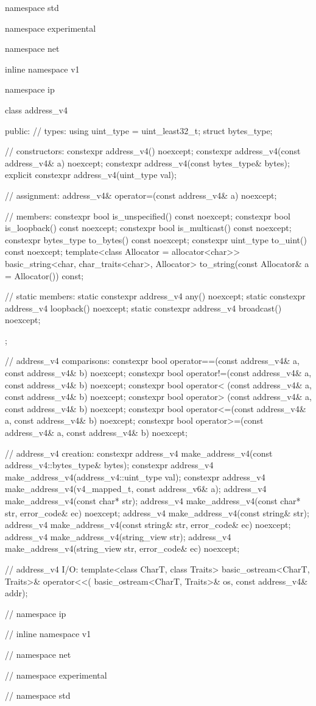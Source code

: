 %
\begin{codeblock}
namespace std {
namespace experimental {
namespace net {
inline namespace v1 {
namespace ip {

  class address_v4
  {
  public:
    // types:
    using uint_type = uint_least32_t;
    struct bytes_type;

    // constructors:
    constexpr address_v4() noexcept;
    constexpr address_v4(const address_v4& a) noexcept;
    constexpr address_v4(const bytes_type& bytes);
    explicit constexpr address_v4(uint_type val);

    // assignment:
    address_v4& operator=(const address_v4& a) noexcept;

    // members:
    constexpr bool is_unspecified() const noexcept;
    constexpr bool is_loopback() const noexcept;
    constexpr bool is_multicast() const noexcept;
    constexpr bytes_type to_bytes() const noexcept;
    constexpr uint_type to_uint() const noexcept;
    template<class Allocator = allocator<char>>
      basic_string<char, char_traits<char>, Allocator>
        to_string(const Allocator& a = Allocator()) const;

    // static members:
    static constexpr address_v4 any() noexcept;
    static constexpr address_v4 loopback() noexcept;
    static constexpr address_v4 broadcast() noexcept;
  };

  // address_v4 comparisons:
  constexpr bool operator==(const address_v4& a, const address_v4& b) noexcept;
  constexpr bool operator!=(const address_v4& a, const address_v4& b) noexcept;
  constexpr bool operator< (const address_v4& a, const address_v4& b) noexcept;
  constexpr bool operator> (const address_v4& a, const address_v4& b) noexcept;
  constexpr bool operator<=(const address_v4& a, const address_v4& b) noexcept;
  constexpr bool operator>=(const address_v4& a, const address_v4& b) noexcept;

  // address_v4 creation:
  constexpr address_v4 make_address_v4(const address_v4::bytes_type& bytes);
  constexpr address_v4 make_address_v4(address_v4::uint_type val);
  constexpr address_v4 make_address_v4(v4_mapped_t, const address_v6& a);
  address_v4 make_address_v4(const char* str);
  address_v4 make_address_v4(const char* str, error_code& ec) noexcept;
  address_v4 make_address_v4(const string& str);
  address_v4 make_address_v4(const string& str, error_code& ec) noexcept;
  address_v4 make_address_v4(string_view str);
  address_v4 make_address_v4(string_view str, error_code& ec) noexcept;

  // address_v4 I/O:
  template<class CharT, class Traits>
    basic_ostream<CharT, Traits>& operator<<(
      basic_ostream<CharT, Traits>& os, const address_v4& addr);

} // namespace ip
} // inline namespace v1
} // namespace net
} // namespace experimental
} // namespace std
\end{codeblock}

